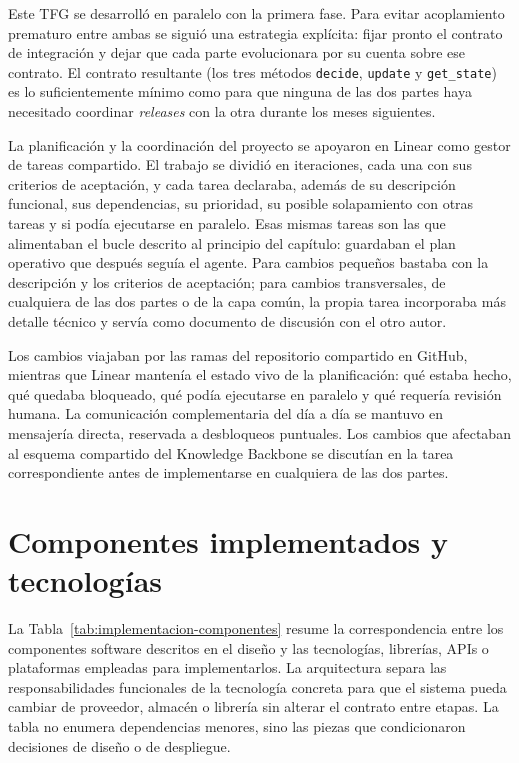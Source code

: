 Este TFG se desarrolló en paralelo con la primera fase. Para evitar
acoplamiento prematuro entre ambas se siguió una estrategia explícita:
fijar pronto el contrato de integración y dejar que cada parte evolucionara
por su cuenta sobre ese contrato. El
contrato resultante (los tres métodos \texttt{decide},
\texttt{update} y \texttt{get\_state}) es lo suficientemente mínimo
como para que ninguna de las dos partes haya necesitado coordinar
\textit{releases} con la otra durante los meses siguientes.

La planificación y la coordinación del proyecto se apoyaron en Linear como
gestor de tareas compartido. El trabajo se dividió en iteraciones, cada una con
sus criterios de aceptación, y cada tarea declaraba, además de su
descripción funcional, sus dependencias, su prioridad, su posible
solapamiento con otras tareas y si podía ejecutarse en paralelo. Esas
mismas tareas son las que alimentaban el bucle descrito al principio del
capítulo: guardaban el plan operativo que después seguía el agente. Para cambios
pequeños bastaba con la descripción y los criterios de aceptación; para
cambios transversales, de cualquiera de las dos partes o de la capa común,
la propia tarea incorporaba más detalle técnico y servía como documento de
discusión con el otro autor.

Los cambios viajaban por las ramas del repositorio compartido en GitHub,
mientras que Linear mantenía el estado vivo de la planificación: qué estaba
hecho, qué quedaba bloqueado, qué podía ejecutarse en paralelo y qué
requería revisión humana. La comunicación complementaria del día a día se
mantuvo en mensajería directa, reservada a desbloqueos puntuales. Los
cambios que afectaban al esquema compartido del Knowledge Backbone se
discutían en la tarea correspondiente antes de implementarse en cualquiera
de las dos partes.

\section{Componentes implementados y tecnologías}

La Tabla~\ref{tab:implementacion-componentes} resume la correspondencia entre
los componentes software descritos en el diseño y las tecnologías, librerías,
APIs o plataformas empleadas para implementarlos. La arquitectura separa las
responsabilidades funcionales de la tecnología concreta para que el sistema
pueda cambiar de proveedor, almacén o librería sin alterar el contrato entre
etapas. La tabla no enumera dependencias menores, sino las piezas que
condicionaron decisiones de diseño o de despliegue.

